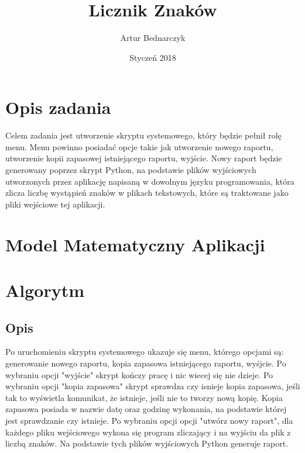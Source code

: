 \documentclass[]{article}
\title{Licznik Znaków}
\author{Artur Bednarczyk}
\date{Styczeń 2018}
\begin{document}
\maketitle
\clearpage
\tableofcontents
\clearpage

\section{Opis zadania}
Celem zadania jest utworzenie skryptu systemowego, który będzie pełnił rolę menu. Menu powinno posiadać opcje takie jak utworzenie nowego raportu, utworzenie kopii zapasowej istniejącego raportu, wyjście. Nowy raport będzie generowany poprzez skrypt Python, na podstawie plików wyjściowych utworzonych przez aplikację napisaną w dowolnym języku programowania, która zlicza liczbę wystąpień znaków w plikach tekstowych, które są traktowane jako pliki wejściowe tej aplikacji.
\section{Model Matematyczny Aplikacji}

\section{Algorytm}
\subsection{Opis}
Po uruchomieniu skryptu systemowego ukazuje się menu, którego opcjami są: generowanie nowego raportu, kopia zapasowa istniejącego raportu, wyśjcie. Po wybraniu opcji "wyjście" skrypt kończy pracę i nic wiecej się nie dzieje. Po wybraniu opcji "kopia zapasowa" skrypt sprawdza czy isnieje kopia zapasowa, jeśli tak to wyświetla komunikat, że istnieje, jeśli nie to tworzy nową kopię. Kopia zapasowa posiada w nazwie datę oraz godzinę wykonania, na podstawie której jest sprawdzanie czy istnieje. Po wybraniu opcji opcji "utwórz nowy raport", dla każdego pliku wejściowego wykona się program zliczający i na wyjściu da plik z liczbą znaków. Na podstawie tych plików wyjściowych Python generuje raport.
\end{document}
